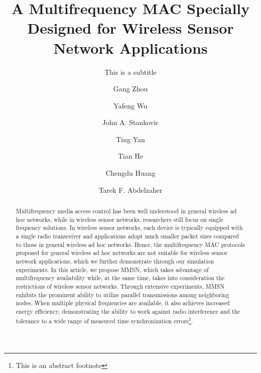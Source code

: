 \documentclass[manuscript, review, screen]{acmart}
\begin{document}
\title{A Multifrequency MAC Specially Designed for Wireless Sensor
  Network Applications} 
 \subtitle{This is a subtitle}
\author{Gang Zhou}
\author{Yafeng Wu}
\author{John A. Stankovic}
\author{Ting Yan}
\author{Tian He}
\author{Chengdu Huang}
\author{Tarek F. Abdelzaher}

\begin{abstract}
Multifrequency media access control has been well understood in
general wireless ad hoc networks, while in wireless sensor networks,
researchers still focus on single frequency solutions. In wireless
sensor networks, each device is typically equipped with a single
radio transceiver and applications adopt much smaller packet sizes
compared to those in general wireless ad hoc networks. Hence, the
multifrequency MAC protocols proposed for general wireless ad hoc
networks are not suitable for wireless sensor network applications,
which we further demonstrate through our simulation experiments. In
this article, we propose MMSN, which takes advantage of
multifrequency availability while, at the same time, takes into
consideration the restrictions of wireless sensor networks. Through
extensive experiments, MMSN exhibits the prominent ability to utilize
parallel transmissions among neighboring nodes. When multiple physical
frequencies are available, it also achieves increased energy
efficiency, demonstrating the ability to work against radio
interference and the tolerance to a wide range of measured time
synchronization errors\footnote{This is an abstract footnote}.
\end{abstract}
\end{document}
